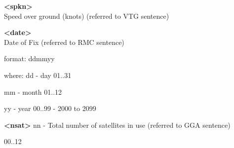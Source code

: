 \textbf{<spkn>} \\
Speed over ground (knots) (referred to VTG sentence)

\textbf{<date>} \\
Date of Fix (referred to RMC sentence)

format:
ddmmyy 
						
where:
dd - day					
01..31

mm - month					
01..12

yy - year						
00..99 - 2000 to 2099

\textbf{<nsat>}
nn - Total number of satellites in use (referred to GGA sentence)
						
00..12
    
    
    
    
    
    
    
    
    
    
    